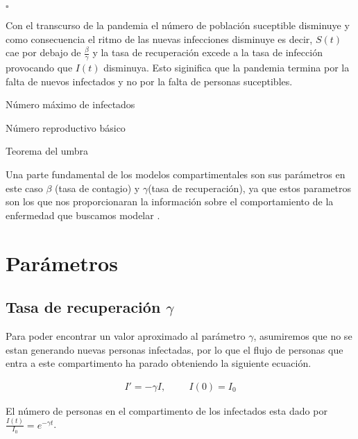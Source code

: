 \hfill	$\square$

Con el transcurso de la pandemia el número de población suceptible disminuye y como consecuencia el ritmo de las nuevas infecciones disminuye es decir, $S(t)$ cae por debajo de $\frac{\beta}{\gamma}$ y la tasa de recuperación excede a la tasa de infección provocando que $I(t)$ disminuya. Esto siginifica que la pandemia termina por la falta de nuevos infectados y no por la falta de personas suceptibles.

\begin{Af}
Número máximo de infectados
\end{Af}

\begin{Af}
Número reproductivo básico
\end{Af}

\begin{Af}
Teorema del umbra
\end{Af}


Una parte fundamental de los modelos compartimentales son sus parámetros en este caso $\beta$ (tasa de contagio) y $\gamma$(tasa de recuperación), ya que estos parametros son los que nos proporcionaran la información sobre el comportamiento de la enfermedad que buscamos modelar \cite{Martcheva}.

\section{Parámetros}
\subsection{Tasa de recuperación \textbf{$\gamma$}}

Para poder encontrar un valor aproximado al parámetro $\gamma$, asumiremos que no se estan generando nuevas personas infectadas, por lo que el flujo de personas que entra a este compartimento ha parado obteniendo la siguiente ecuación.

\begin{align}
I' = -\gamma I, \hspace{1cm} I(0) = I_{0}
\end{align}

\begin{Af}

El número de personas en el compartimento de los infectados esta dado por $\frac{I(t)}{I_{0}} = e^{-\gamma t}$.

\end{Af}

